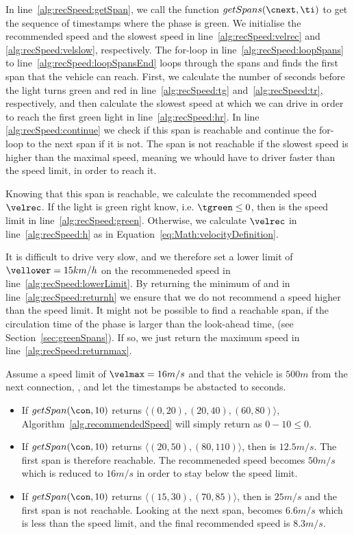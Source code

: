 In line~\ref{alg:recSpeed:getSpan}, we call the function $getSpans(\cnext, \ti)$ to get the sequence of timestamps where the phase is green.
We initialise the recommended speed and the slowest speed in line~\ref{alg:recSpeed:velrec} and \ref{alg:recSpeed:velslow}, respectively.
The for-loop in line~\ref{alg:recSpeed:loopSpans} to line~\ref{alg:recSpeed:loopSpansEnd} loops through the spans and finds the first span that the vehicle can reach.
First, we calculate the number of seconds before the light turns green and red in line~\ref{alg:recSpeed:tg} and~\ref{alg:recSpeed:tr}, respectively, and then calculate the slowest speed at which we can drive in order to reach the first green light in line~\ref{alg:recSpeed:hr}.
In line \ref{alg:recSpeed:continue} we check if this span is reachable and continue the for-loop to the next span if it is not. 
The span is not reachable if the slowest speed is higher than the maximal speed, meaning we whould have to driver faster than the speed limit, in order to reach it.

Knowing that this span is reachable, we calculate the recommended speed $\velrec$.
If the light is green right know, i.e. $\tgreen \leq 0$, then \velrec is the speed limit in line~\ref{alg:recSpeed:green}. 
Otherwise, we calculate $\velrec$ in line~\ref{alg:recSpeed:h} as in Equation~\ref{eq:Math:velocityDefinition}.

It is difficult to drive very slow, and we therefore set a lower limit of $\vellower=15km/h$ on the recommeneded speed in line~\ref{alg:recSpeed:lowerLimit}. 
By returning the minimum of \velrec and \velmax in line~\ref{alg:recSpeed:returnh} we ensure that we do not recommend a speed higher than the speed limit.
It might not be possible to find a reachable span, if the circulation time of the phase is larger than the look-ahead time, \tmax (see Section~\ref{sec:greenSpans}).
If so, we just return the maximum speed in line~\ref{alg:recSpeed:returnmax}.

Assume a speed limit of $\velmax = 16 m/s$ and that the vehicle is $500 m$ from the next connection, \con, and let  the timestamps be abstacted to seconds.
\begin{itemize}
\item If $getSpan(\con, 10)$ returns $\langle(0,20), (20,40), (60,80)\rangle$, Algorithm~\ref{alg.recommendedSpeed} will simply return \velmax as $0-10 \leq 0$.
\item If $getSpan(\con, 10)$ returns $\langle(20,50), (80,110)\rangle$, then \velslow is $12.5 m/s$.
The first span is therefore reachable. 
The recommeneded speed becomes $50m/s$ which is reduced to $16 m/s$ in order to stay below the speed limit.
\item If $getSpan(\con, 10)$ returns $\langle(15,30), (70,85)\rangle$, then \velslow is $25 m/s$ and the first span is not reachable.
Looking at the next span, \velslow becomes $6.6m/s$ which is less than the speed limit, and the final recommended speed is $8.3 m/s$.
\end{itemize}

